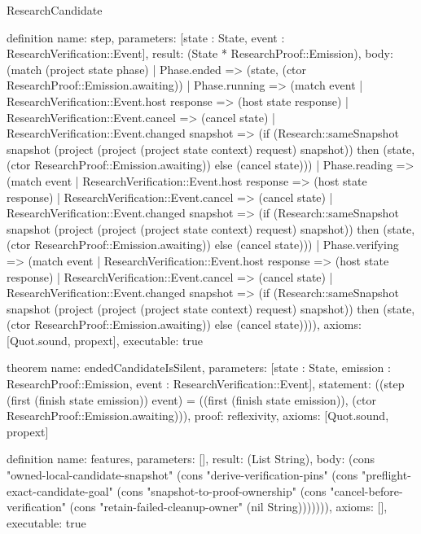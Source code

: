 \begin{lexlean}{ResearchCandidate}
\begin{semanticmodule}
definition{
 name: step,
 parameters: [state : State, event : ResearchVerification::Event],
 result: (State * ResearchProof::Emission),
 body: (match (project state phase) | Phase.ended => (state, (ctor ResearchProof::Emission.awaiting)) | Phase.running => (match event | ResearchVerification::Event.host response => (host state response) | ResearchVerification::Event.cancel => (cancel state) | ResearchVerification::Event.changed snapshot => (if (Research::sameSnapshot snapshot (project (project (project state context) request) snapshot)) then (state, (ctor ResearchProof::Emission.awaiting)) else (cancel state))) | Phase.reading => (match event | ResearchVerification::Event.host response => (host state response) | ResearchVerification::Event.cancel => (cancel state) | ResearchVerification::Event.changed snapshot => (if (Research::sameSnapshot snapshot (project (project (project state context) request) snapshot)) then (state, (ctor ResearchProof::Emission.awaiting)) else (cancel state))) | Phase.verifying => (match event | ResearchVerification::Event.host response => (host state response) | ResearchVerification::Event.cancel => (cancel state) | ResearchVerification::Event.changed snapshot => (if (Research::sameSnapshot snapshot (project (project (project state context) request) snapshot)) then (state, (ctor ResearchProof::Emission.awaiting)) else (cancel state)))),
 axioms: [Quot.sound, propext],
 executable: true
}

theorem{
 name: endedCandidateIsSilent,
 parameters: [state : State, emission : ResearchProof::Emission, event : ResearchVerification::Event],
 statement: ((step (first (finish state emission)) event) = ((first (finish state emission)), (ctor ResearchProof::Emission.awaiting))),
 proof: reflexivity{},
 axioms: [Quot.sound, propext]
}

definition{
 name: features,
 parameters: [],
 result: (List String),
 body: (cons "owned-local-candidate-snapshot" (cons "derive-verification-pins" (cons "preflight-exact-candidate-goal" (cons "snapshot-to-proof-ownership" (cons "cancel-before-verification" (cons "retain-failed-cleanup-owner" (nil String))))))),
 axioms: [],
 executable: true
}
\end{semanticmodule}
\end{lexlean}
